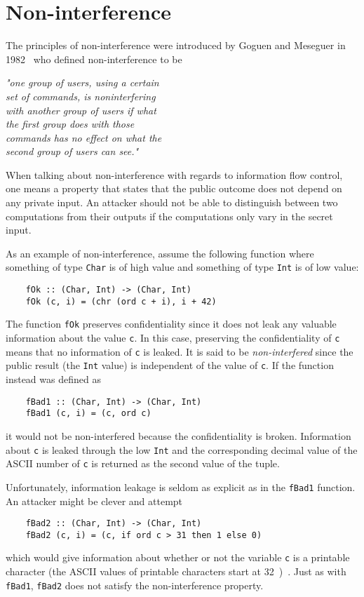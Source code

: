 \section{Non-interference}
The principles of non-interference were introduced by Goguen and Meseguer in 1982~\cite{non-interference-goguen-meseguer} who defined non-interference to be
\newline
\begin{center}
  \emph{"one group of users, using a certain\\set of commands, is noninterfering\\with another group of users if what\\the first group does with those\\commands has no effect on what the\\second group of users can see."}
\end{center}
When talking about non-interference with regards to information flow control, one means a property that states that the public outcome does not depend on any private input. An attacker should not be able to distinguish between two computations from their outputs if the computations only vary in the secret input.

As an example of non-interference, assume the following function where something of type {\tt Char} is of high value and something of type {\tt Int} is of low value:
\begin{verbatim}
    fOk :: (Char, Int) -> (Char, Int)
    fOk (c, i) = (chr (ord c + i), i + 42)
\end{verbatim}
The function {\tt fOk} preserves confidentiality since it does not leak any valuable information about the value {\tt c}. In this case, preserving the confidentiality of {\tt c} means that no information of {\tt c} is leaked. It is said to be \emph{non-interfered} since the public result (the {\tt Int} value) is independent of the value of {\tt c}. If the function instead was defined as
\begin{verbatim}
    fBad1 :: (Char, Int) -> (Char, Int)
    fBad1 (c, i) = (c, ord c)
\end{verbatim}
it would not be non-interfered because the confidentiality is broken. Information about {\tt c} is leaked through the low {\tt Int} and the corresponding decimal value of the ASCII number of {\tt c} is returned as the second value of the tuple.

Unfortunately, information leakage is seldom as explicit as in the {\tt fBad1} function. An attacker might be clever and attempt
\begin{verbatim}
    fBad2 :: (Char, Int) -> (Char, Int)
    fBad2 (c, i) = (c, if ord c > 31 then 1 else 0)
\end{verbatim}
which would give information about whether or not the variable {\tt c} is a printable character (the ASCII values of printable characters start at 32~\cite{ascii})~\cite{seclib}. Just as with {\tt fBad1}, {\tt fBad2} does not satisfy the non-interference property.

